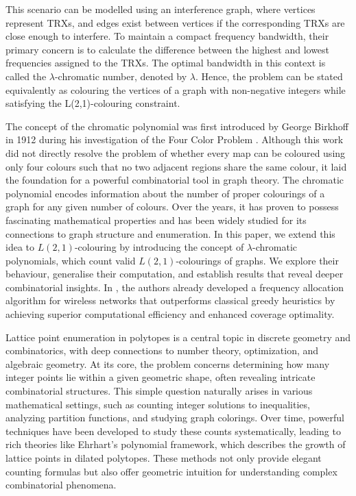 \documentclass{birkjour}
\theoremstyle{definition}
\theoremstyle{remark}
\numberwithin{equation}{section}
\begin{document}
This scenario can be modelled using an interference graph, where vertices represent TRXs, and edges exist between vertices if the corresponding TRXs are close enough to interfere. To maintain a compact frequency
bandwidth, their primary concern is to calculate the difference between the
highest and lowest frequencies assigned to the TRXs. The optimal
bandwidth in this context is called the $\lambda$-chromatic number, denoted
by $\lambda$. Hence, the problem can be stated equivalently as colouring the vertices
of a graph with non-negative integers while satisfying the L(2,1)-colouring
constraint.

The concept of the chromatic polynomial was first introduced by George Birkhoff in 1912 during his investigation of the Four Color Problem \cite{BG}. Although this work did not directly resolve the problem of whether every map can be coloured using only four colours such that no two adjacent regions share the same colour, it laid the foundation for a powerful combinatorial tool in graph theory. The chromatic polynomial encodes information about the number of proper colourings of a graph for any given number of colours. Over the years, it has proven to possess fascinating mathematical properties and has been widely studied for its connections to graph structure and enumeration. In this paper, we extend this idea to $L(2,1)$-colouring by introducing the concept of $\lambda$-chromatic polynomials, which count valid $L(2,1)$-colourings of graphs. We explore their behaviour, generalise their computation, and establish results that reveal deeper combinatorial insights. In \cite{ANN}, the authors already developed a frequency allocation algorithm for wireless networks that outperforms classical greedy heuristics by achieving superior computational efficiency and enhanced coverage optimality.

Lattice point enumeration in polytopes is a central topic in discrete geometry and combinatorics, with deep connections to number theory, optimization, and algebraic geometry. At its core, the problem concerns determining how many integer points lie within a given geometric shape, often revealing intricate combinatorial structures. This simple question naturally arises in various mathematical settings, such as counting integer solutions to inequalities, analyzing partition functions, and studying graph colorings. Over time, powerful techniques have been developed to study these counts systematically, leading to rich theories like Ehrhart’s polynomial framework, which describes the growth of lattice points in dilated polytopes. These methods not only provide elegant counting formulas but also offer geometric intuition for understanding complex combinatorial phenomena.
\end{document}
